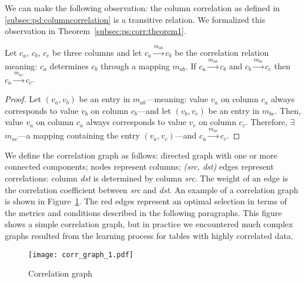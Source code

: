 We can make the following observation: the column correlation as defined in \ref{subsec:pd:columncorrelation} is a transitive relation. We formalized this observation in Theorem~\ref{subsec:ps:corr:theorem1}.

\begin{theorem}
\label{subsec:ps:corr:theorem1}
Let \(c_{a}\), \(c_{b}\), \(c_{c}\) be three columns and let \(c_{a} \xrightarrow{m_{ab}} c_{b}\) be the correlation relation meaning: \(c_{a}\) determines \(c_{b}\) through a mapping \(m_{ab}\). If \(c_{a} \xrightarrow{m_{ab}} c_{b}\) and \(c_{b} \xrightarrow{m_{bc}} c_{c}\) then \(c_{a} \xrightarrow{m_{ac}} c_{c}\).
\end{theorem}
\begin{proof}
Let \((v_{a}, v_{b})\) be an entry in \(m_{ab}\)---meaning: value \(v_{a}\) on column \(c_{a}\) always corresponds to value \(v_{b}\) on column \(c_{b}\)---and let \((v_{b}, v_{c})\) be an entry in \(m_{bc}\). Then, value \(v_{a}\) on column \(c_{a}\) always corresponds to value \(v_{c}\) on column \(c_{c}\). Therefore, \(\exists\) \(m_{ac}\)---a mapping containing the entry \((v_{a}, v_{c})\)---and \(c_{a} \xrightarrow{m_{ac}} c_{c}\).
\end{proof}

We define the correlation graph as follows: directed graph with one or more connected components; nodes represent columns; \textit{(src, dst)} edges represent correlations: column \textit{dst} is determined by column \textit{src}. The weight of an edge is the correlation coefficient between \textit{src} and \textit{dst}. An example of a correlation graph is shown in Figure~\ref{fig:ps:columncorrelation:corrgraph1}. The red edges represent an optimal selection in terms of the metrics and conditions described in the following paragraphs. This figure shows a simple correlation graph, but in practice we encountered much complex graphs resulted from the learning process for tables with highly correlated data.

\begin{figure}[h]
  \centering
  \texttt{[image: corr\_graph\_1.pdf]}
  \caption{Correlation graph}
  \label{fig:ps:columncorrelation:corrgraph1}
\end{figure}

